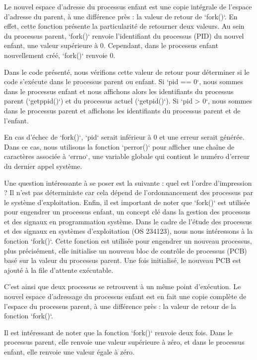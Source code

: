 \documentclass[12pt]{article}
\begin{document}
Le nouvel espace d'adresse du processus enfant est une copie intégrale de l'espace d'adresse du parent, à une différence près : la valeur de retour de `fork()`. En effet, cette fonction présente la particularité de retourner deux valeurs. Au sein du processus parent, `fork()` renvoie l'identifiant du processus (PID) du nouvel enfant, une valeur supérieure à 0. Cependant, dans le processus enfant nouvellement créé, `fork()` renvoie 0. 

Dans le code présenté, nous vérifions cette valeur de retour pour déterminer si le code s'exécute dans le processus parent ou enfant. Si `pid == 0`, nous sommes dans le processus enfant et nous affichons alors les identifiants du processus parent (`getppid()`) et du processus actuel (`getpid()`). Si `pid > 0`, nous sommes dans le processus parent et affichons les identifiants du processus parent et de l'enfant. 

En cas d'échec de `fork()`, `pid` serait inférieur à 0 et une erreur serait générée. Dans ce cas, nous utilisons la fonction `perror()` pour afficher une chaîne de caractères associée à `errno`, une variable globale qui contient le numéro d'erreur du dernier appel système.

Une question intéressante à se poser est la suivante : quel est l'ordre d'impression ? Il n'est pas déterministe car cela dépend de l'ordonnancement des processus par le système d'exploitation. Enfin, il est important de noter que `fork()` est utilisée pour engendrer un processus enfant, un concept clé dans la gestion des processus et des signaux en programmation système.
Dans le cadre de l'étude des processus et des signaux en systèmes d'exploitation (OS 234123), nous nous intéressons à la fonction `fork()`. Cette fonction est utilisée pour engendrer un nouveau processus, plus précisément, elle initialise un nouveau bloc de contrôle de processus (PCB) basé sur la valeur du processus parent. Une fois initialisé, le nouveau PCB est ajouté à la file d'attente exécutable. 

C'est ainsi que deux processus se retrouvent à un même point d'exécution. Le nouvel espace d'adressage du processus enfant est en fait une copie complète de l'espace du processus parent, à une différence près : la valeur de retour de la fonction `fork()`.

Il est intéressant de noter que la fonction `fork()` renvoie deux fois. Dans le processus parent, elle renvoie une valeur supérieure à zéro, et dans le processus enfant, elle renvoie une valeur égale à zéro. 
\end{document}
